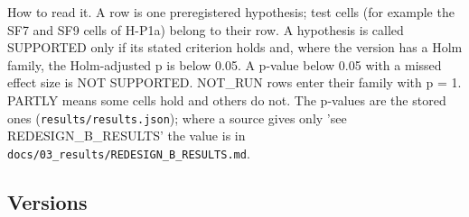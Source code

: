 


How to read it. A row is one preregistered hypothesis; test cells (for example the SF7 and SF9 cells of H-P1a) belong to their row. A hypothesis is called SUPPORTED only if its stated criterion holds and, where the version has a Holm family, the Holm-adjusted p is below 0.05. A p-value below 0.05 with a missed effect size is NOT SUPPORTED. NOT\_RUN rows enter their family with p = 1. PARTLY means some cells hold and others do not. The p-values are the stored ones (\texttt{results/results.json}); where a source gives only 'see REDESIGN\_B\_RESULTS' the value is in \texttt{docs/03\_results/REDESIGN\_B\_RESULTS.md}.

\subsection*{Versions}


